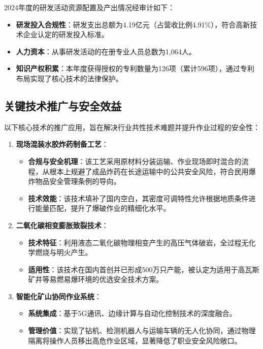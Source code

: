\documentclass[a4paper,12pt]{article}
\begin{document}
2024年度的研发活动资源配置及产出情况经审计如下：

\begin{itemize}
    \item \textbf{研发投入合规性}：研发支出总额为4.19亿元（占营收比例4.91\%），符合高新技术企业认定的研发投入标准。
    \item \textbf{人力资本}：从事研发活动的在册专业人员总数为1,064人。
    \item \textbf{知识产权积累}：本年度获得授权的专利数量为126项（累计596项），通过专利布局实现了核心技术的法律保护。
\end{itemize}

\subsection{关键技术推广与安全效益}

以下核心技术的推广应用，旨在解决行业共性技术难题并提升作业过程的安全性：

\begin{enumerate}
    \item \textbf{现场混装水胶炸药制备工艺}：
    \begin{itemize}
        \item \textbf{合规与安全机理}：该工艺采用原材料分装运输、作业现场即时混合的流程，从根本上规避了成品炸药在长途运输中的公共安全风险，符合民用爆炸物品安全管理条例的导向。
        \item \textbf{技术效能}：该技术填补了国内空白，其密度可调特性允许根据地质条件进行能量匹配，提升了爆破作业的精细化水平。
    \end{itemize}
    
    \item \textbf{二氧化碳相变膨胀致裂技术}：
    \begin{itemize}
        \item \textbf{技术特征}：利用液态二氧化碳物理相变产生的高压气体破岩，全过程无化学燃烧与明火产生。
        \item \textbf{适用性}：该技术在国内首创并已形成500万只产能，被认定为适用于高瓦斯矿井等易燃易爆环境的优选安全技术方案。
    \end{itemize}
    
    \item \textbf{智能化矿山协同作业系统}：
    \begin{itemize}
        \item \textbf{系统集成}：基于5G通讯、边缘计算与自动化控制技术的深度融合。
        \item \textbf{管理价值}：实现了钻机、检测机器人与运输车辆的无人化协同，通过物理隔离将操作人员移出高危作业区域，显著降低了职业安全风险敞口。
    \end{itemize}
\end{enumerate}
\end{document}
